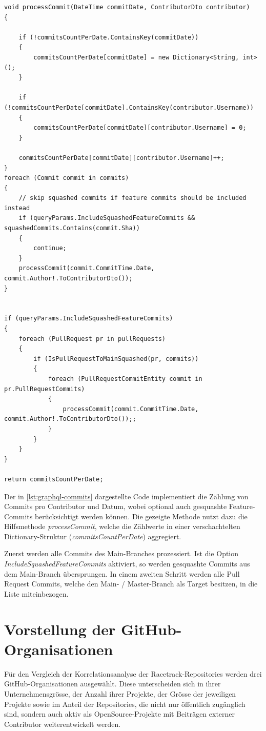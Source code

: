 \begin{lstlisting}[language=CSharp, caption={Verarbeitung gesquashter Commits in der Methode \textit{GetCommitsCountPerDate}}, label={lst:graphql-commits}]
void processCommit(DateTime commitDate, ContributorDto contributor)
{

	if (!commitsCountPerDate.ContainsKey(commitDate))
	{
		commitsCountPerDate[commitDate] = new Dictionary<String, int>();
	}

	if (!commitsCountPerDate[commitDate].ContainsKey(contributor.Username))
	{
		commitsCountPerDate[commitDate][contributor.Username] = 0;
	}

	commitsCountPerDate[commitDate][contributor.Username]++;
}
foreach (Commit commit in commits)
{
	// skip squashed commits if feature commits should be included instead
	if (queryParams.IncludeSquashedFeatureCommits && squashedCommits.Contains(commit.Sha))
	{
		continue;
	}
	processCommit(commit.CommitTime.Date, commit.Author!.ToContributorDto());
}


if (queryParams.IncludeSquashedFeatureCommits)
{
	foreach (PullRequest pr in pullRequests)
	{
		if (IsPullRequestToMainSquashed(pr, commits))
		{
			foreach (PullRequestCommitEntity commit in pr.PullRequestCommits)
			{
				processCommit(commit.CommitTime.Date, commit.Author!.ToContributorDto());;		
			}	
		}
	}
}

return commitsCountPerDate;
\end{lstlisting}

Der in \autoref{lst:graphql-commits} dargestellte Code implementiert die Zählung von Commits pro Contributor und Datum, wobei optional auch gesquashte Feature-Commits berücksichtigt werden können. Die gezeigte Methode nutzt dazu die Hilfsmethode \textit{processCommit}, welche die Zählwerte in einer verschachtelten Dictionary-Struktur (\textit{commitsCountPerDate}) aggregiert.

Zuerst werden alle Commits des Main-Branches prozessiert. Ist die Option \textit{IncludeSquashedFeatureCommits} aktiviert, so werden gesquashte Commits aus dem Main-Branch übersprungen. In einem zweiten Schritt werden alle Pull Request Commits, welche den Main- / Master-Branch als Target besitzen, in die Liste miteinbezogen. 

\section{Vorstellung der GitHub-Organisationen}
\label{sec:VorstellungGithubOrgs}
Für den Vergleich der Korrelationsanalyse der Racetrack-Repositories werden drei GitHub-Organisationen ausgewählt. Diese unterscheiden sich in ihrer Unternehmensgrösse, der Anzahl ihrer Projekte, der Grösse der jeweiligen Projekte sowie im Anteil der Repositories, die nicht nur öffentlich zugänglich sind, sondern auch aktiv als OpenSource-Projekte mit Beiträgen externer Contributor weiterentwickelt werden.

